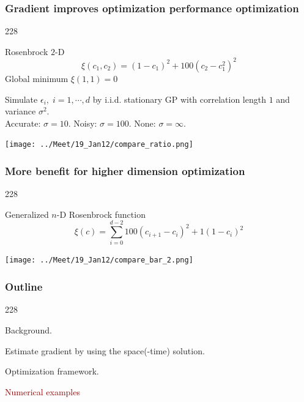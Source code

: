 \documentclass{beamer}
\newcommand{\barrow}{\item[\color{darkred}\ding{228}]}
\begin{document}
\begin{frame}
    \frametitle{Gradient improves optimization performance \hfill \scriptsize{optimization}}\small
    \begin{dinglist}{228}
    \barrow Rosenbrock $2$-D
    $$
        \xi(c_1,c_2) = (1-c_1)^2 + 100(c_2-c_1^2)^2
    $$
    Global minimum $\xi(1, 1) = 0$
        \barrow Simulate $\epsilon_i,\; i=1,\cdots, d$ by i.i.d. stationary GP with correlation length
        $1$ and variance $\sigma^2$.\\
            Accurate: $\sigma=10$.
            Noisy: $\sigma=100$.
            None: $\sigma=\infty$.
     \end{dinglist}
       \begin{center}
           \texttt{[image: ../Meet/19\_Jan12/compare\_ratio.png]}
       \end{center}
\end{frame}

\begin{frame}
   \frametitle{More benefit for higher dimension \hfill \scriptsize{optimization}}\small
   \begin{dinglist}{228}
      \barrow
      Generalized $n$-D Rosenbrock function
      $$
          \xi(c) = \sum_{i=0}^{d-2} 100(c_{i+1}-c_i)^2 + 1(1-c_i)^2 
      $$
   \end{dinglist}
   \begin{center}
       \texttt{[image: ../Meet/19\_Jan12/compare\_bar\_2.png]}
   \end{center}
\end{frame}


\setcounter{framenumber}{40}
\begin{frame}
    \frametitle{Outline}\small
    \begin{dinglist}{228}
        \barrow {}Background.
        \barrow Estimate gradient by using the space(-time) solution.
        \barrow Optimization framework.
        \barrow \textcolor{darkred}{Numerical examples}
    \end{dinglist}
\end{frame}
\end{document}
